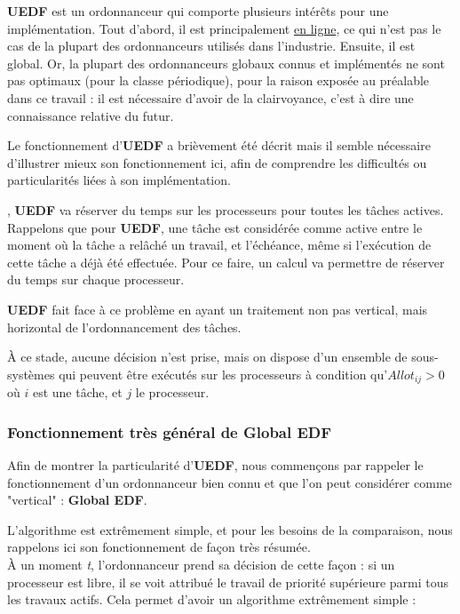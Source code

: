 	\textbf{UEDF} est un ordonnanceur qui comporte plusieurs intérêts pour une implémentation.
	Tout d'abord, il est principalement \hyperref[inline]{en ligne}, ce qui n'est pas le cas de 
	la plupart des ordonnanceurs utilisés dans l'industrie. 
	Ensuite, il est global. Or, la plupart des ordonnanceurs 
	globaux connus et implémentés ne sont pas optimaux (pour la classe périodique), pour la
	raison exposée au préalable dans ce travail : il est nécessaire d'avoir de la clairvoyance, 
	c'est à dire une connaissance relative du futur.\newline
	
	Le fonctionnement d'\textbf{UEDF} a brièvement été décrit mais il semble nécessaire d'illustrer 
	mieux son fonctionnement ici, afin de comprendre les difficultés ou particularités liées 
	à son implémentation.\newline
	
	
	
	, \textbf{UEDF} va réserver du temps sur les processeurs pour toutes les tâches actives.
	Rappelons que pour \textbf{UEDF}, une tâche est considérée comme active entre le moment où la tâche 
	a relâché un travail, et l'échéance, même si l'exécution de cette tâche a déjà été effectuée.
	Pour ce faire, un calcul va permettre de réserver du temps sur chaque processeur.
	
	\textbf{UEDF} fait face à ce problème en ayant un traitement non pas vertical, mais horizontal
	de l'ordonnancement des tâches.	

	À ce stade, aucune décision n'est prise, mais on dispose d'un ensemble de sous-systèmes qui peuvent 
	être exécutés sur les processeurs à condition qu'$Allot_{ij} > 0$ où $i$ est une tâche, 
	et $j$ le processeur.
	

		\subsubsection{Fonctionnement très général de Global EDF}
		Afin de montrer la particularité d'\textbf{UEDF}, nous commençons par rappeler le fonctionnement 
		d'un ordonnanceur bien connu et que l'on peut considérer comme "vertical" : \textbf{Global EDF}. 
		
		L'algorithme est extrêmement simple, et pour les besoins de la comparaison, nous rappelons 
		ici son fonctionnement de façon très résumée.\\
		À un moment \textit{t}, l'ordonnanceur prend sa décision de cette façon :
		si un processeur est libre, il se voit attribué le travail de priorité supérieure parmi 
		tous les travaux actifs. Cela permet d'avoir un algorithme extrêmement simple :\newline
		
